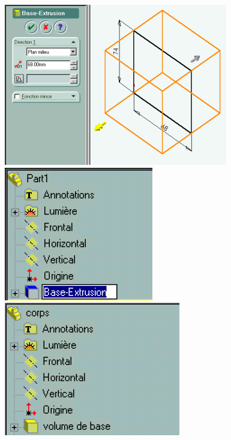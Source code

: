 \begin{minipage}{0.23\linewidth}
\includegraphics[width=0.9\linewidth]{img/003_3} \\ \vfill
\includegraphics[width=0.9\linewidth]{img/004_3} \\ \vfill
\includegraphics[width=0.9\linewidth]{img/005}
\end{minipage}

